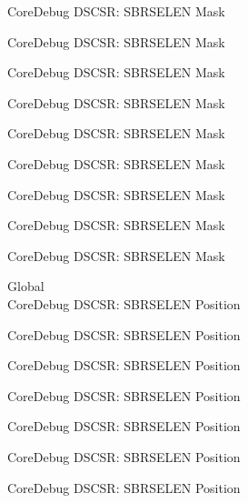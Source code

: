 \begin{DoxyRefList}
\label{deprecated__deprecated000651}%
%
Core\+Debug DSCSR\+: SBRSELEN Mask 

\label{deprecated__deprecated000776}%
%
Core\+Debug DSCSR\+: SBRSELEN Mask 

\label{deprecated__deprecated000830}%
%
Core\+Debug DSCSR\+: SBRSELEN Mask 

\label{deprecated__deprecated000906}%
%
Core\+Debug DSCSR\+: SBRSELEN Mask 

\label{deprecated__deprecated000969}%
%
Core\+Debug DSCSR\+: SBRSELEN Mask 

\label{deprecated__deprecated001048}%
%
Core\+Debug DSCSR\+: SBRSELEN Mask 

\label{deprecated__deprecated001124}%
%
Core\+Debug DSCSR\+: SBRSELEN Mask 

\label{deprecated__deprecated001227}%
%
Core\+Debug DSCSR\+: SBRSELEN Mask 

\label{deprecated__deprecated001329}%
%
Core\+Debug DSCSR\+: SBRSELEN Mask  
\item[Global \doxylink{group___c_m_s_i_s___s_c_b_ga3eb88e444b678057db1b59272eebb1ad}{Core\+Debug\+\_\+\+DSCSR\+\_\+\+SBRSELEN\+\_\+\+Pos} ]\hfill \\
\label{deprecated__deprecated000097}%
%
Core\+Debug DSCSR\+: SBRSELEN Position 

\label{deprecated__deprecated000151}%
%
Core\+Debug DSCSR\+: SBRSELEN Position 

\label{deprecated__deprecated000227}%
%
Core\+Debug DSCSR\+: SBRSELEN Position 

\label{deprecated__deprecated000290}%
%
Core\+Debug DSCSR\+: SBRSELEN Position 

\label{deprecated__deprecated000369}%
%
Core\+Debug DSCSR\+: SBRSELEN Position 

\label{deprecated__deprecated000445}%
%
Core\+Debug DSCSR\+: SBRSELEN Position 

\label{deprecated__deprecated000548}%
%
Core\+Debug DSCSR\+: SBRSELEN Position 


\end{DoxyRefList}
